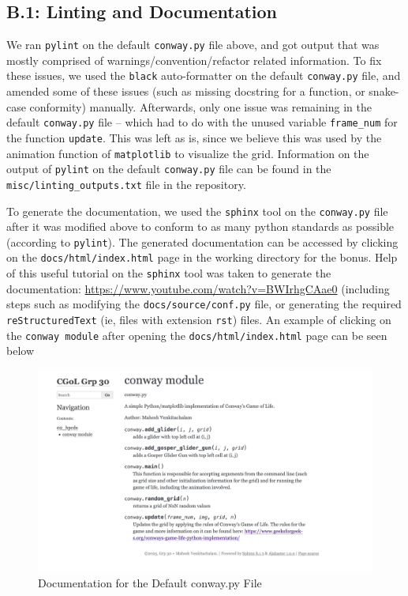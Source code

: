 \documentclass[a4paper,12pt]{article}
\begin{document}
\subsection{B.1: Linting and Documentation}
We ran \verb|pylint| on the default \verb|conway.py| file above, and got output that was mostly comprised of warnings/convention/refactor related information. To fix these issues, we used the \verb|black| auto-formatter on the default \verb|conway.py| file, and amended some of these issues (such as missing docstring for a function, or snake-case conformity) manually. Afterwards, only one issue was remaining in the default \verb|conway.py| file -- which had to do with the unused variable \verb|frame_num| for the function \verb|update|. This was left as is, since we believe this was used by the animation function of \verb|matplotlib| to visualize the grid. Information on the output of \verb|pylint| on the default \verb|conway.py| file can be found in the \verb|misc/linting_outputs.txt| file in the repository. 

To generate the documentation, we used the \verb|sphinx| tool on the \verb|conway.py| file after it was modified above to conform to as many python standards as possible (according to \verb|pylint|). The generated documentation can be accessed by clicking on the \verb|docs/html/index.html| page in the working directory for the bonus. Help of this useful tutorial on the \verb|sphinx| tool was taken to generate the documentation: \url{https://www.youtube.com/watch?v=BWIrhgCAae0} (including steps such as modifying the \verb|docs/source/conf.py| file, or generating the required \verb|reStructuredText| (ie, files with extension \verb|rst|) files. An example of clicking on the \verb|conway module| after opening the \verb|docs/html/index.html| page can be seen below

\begin{figure}[h!]
  \centering
  \includegraphics[width=\textwidth]{images/conway_documentation_example.png}
  \caption{Documentation for the Default conway.py File}
  \label{fig:conway_docs}
\end{figure}
\end{document}
